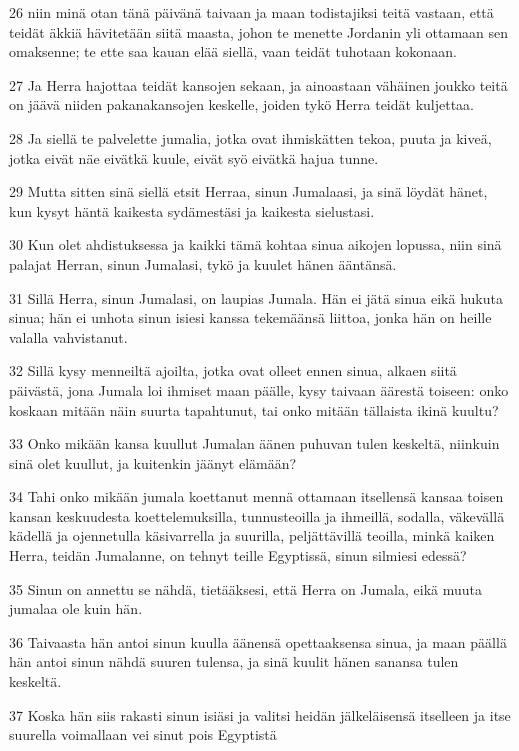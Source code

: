 \par 26 niin minä otan tänä päivänä taivaan ja maan todistajiksi teitä vastaan, että teidät äkkiä hävitetään siitä maasta, johon te menette Jordanin yli ottamaan sen omaksenne; te ette saa kauan elää siellä, vaan teidät tuhotaan kokonaan.
\par 27 Ja Herra hajottaa teidät kansojen sekaan, ja ainoastaan vähäinen joukko teitä on jäävä niiden pakanakansojen keskelle, joiden tykö Herra teidät kuljettaa.
\par 28 Ja siellä te palvelette jumalia, jotka ovat ihmiskätten tekoa, puuta ja kiveä, jotka eivät näe eivätkä kuule, eivät syö eivätkä hajua tunne.
\par 29 Mutta sitten sinä siellä etsit Herraa, sinun Jumalaasi, ja sinä löydät hänet, kun kysyt häntä kaikesta sydämestäsi ja kaikesta sielustasi.
\par 30 Kun olet ahdistuksessa ja kaikki tämä kohtaa sinua aikojen lopussa, niin sinä palajat Herran, sinun Jumalasi, tykö ja kuulet hänen ääntänsä.
\par 31 Sillä Herra, sinun Jumalasi, on laupias Jumala. Hän ei jätä sinua eikä hukuta sinua; hän ei unhota sinun isiesi kanssa tekemäänsä liittoa, jonka hän on heille valalla vahvistanut.
\par 32 Sillä kysy menneiltä ajoilta, jotka ovat olleet ennen sinua, alkaen siitä päivästä, jona Jumala loi ihmiset maan päälle, kysy taivaan äärestä toiseen: onko koskaan mitään näin suurta tapahtunut, tai onko mitään tällaista ikinä kuultu?
\par 33 Onko mikään kansa kuullut Jumalan äänen puhuvan tulen keskeltä, niinkuin sinä olet kuullut, ja kuitenkin jäänyt elämään?
\par 34 Tahi onko mikään jumala koettanut mennä ottamaan itsellensä kansaa toisen kansan keskuudesta koettelemuksilla, tunnusteoilla ja ihmeillä, sodalla, väkevällä kädellä ja ojennetulla käsivarrella ja suurilla, peljättävillä teoilla, minkä kaiken Herra, teidän Jumalanne, on tehnyt teille Egyptissä, sinun silmiesi edessä?
\par 35 Sinun on annettu se nähdä, tietääksesi, että Herra on Jumala, eikä muuta jumalaa ole kuin hän.
\par 36 Taivaasta hän antoi sinun kuulla äänensä opettaaksensa sinua, ja maan päällä hän antoi sinun nähdä suuren tulensa, ja sinä kuulit hänen sanansa tulen keskeltä.
\par 37 Koska hän siis rakasti sinun isiäsi ja valitsi heidän jälkeläisensä itselleen ja itse suurella voimallaan vei sinut pois Egyptistä
